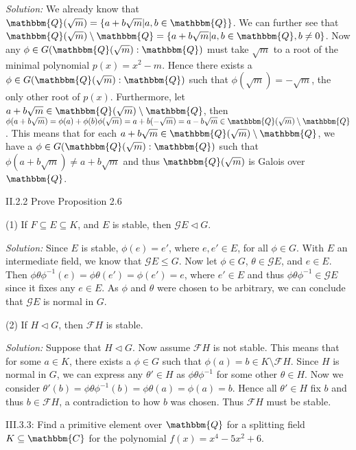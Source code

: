 \documentclass{letter}
\newcommand{\tmem}[1]{{\em #1\/}}
\begin{document}
{\tmem{Solution:}} We already know that $\mathbbm{Q}( \sqrt{m}) =\{a + b
\sqrt{m} | a, b \in \mathbbm{Q}\}$. We can further see that $\mathbbm{Q}(
\sqrt{m}) \setminus \mathbbm{Q}=\{a + b \sqrt{m} | a, b \in \mathbbm{Q}, b
\neq 0\}$. Now any $\phi \in G (\mathbbm{Q}( \sqrt{m}) : \mathbbm{Q})$ must
take $\sqrt{m}$ to a root of the minimal polynomial $p (x) = x^2 - m$. Hence
there exists a $\phi \in G (\mathbbm{Q}( \sqrt{m}) : \mathbbm{Q})$ such that
$\phi ( \sqrt{m}) = - \sqrt{m}$, the only other root of $p (x)$. Furthermore,
let $a + b \sqrt{m} \in \mathbbm{Q}( \sqrt{m}) \setminus \mathbbm{Q}$, then
$\phi (a + b \sqrt{m}) = \phi (a) + \phi (b) \phi ( \sqrt{m}) = a + b (-
\sqrt{m}) = a - b \sqrt{m} \in \mathbbm{Q}( \sqrt{m}) \setminus \mathbbm{Q}$.
This means that for each $a + b \sqrt{m} \in \mathbbm{Q}( \sqrt{m}) \setminus
\mathbbm{Q}$, we have a $\phi \in G (\mathbbm{Q}( \sqrt{m}) : \mathbbm{Q})$
such that $\phi (a + b \sqrt{m}) \neq a + b \sqrt{m}$ and thus $\mathbbm{Q}(
\sqrt{m})$ is Galois over $\mathbbm{Q}$.

II.2.2 Prove Proposition 2.6

(1) If $F \subseteq E \subseteq K$, and $E$ is stable, then $\mathcal{G} E
\vartriangleleft G$.

{\tmem{Solution:}} Since $E$ is stable, $\phi (e) = e'$, where $e, e' \in E$,
for all $\phi \in G$. With $E$ an intermediate field, we know that
$\mathcal{G} E \leq G$. Now let $\phi \in G$, $\theta \in \mathcal{G} E$, and
$e \in E$. Then $\phi \theta \phi^{- 1} (e) = \phi \theta (e') = \phi (e') =
e$, where $e' \in E$ and thus $\phi \theta \phi^{- 1} \in \mathcal{G} E$ since
it fixes any $e \in E$. As $\phi$ and $\theta$ were chosen to be arbitrary, we
can conclude that $\mathcal{G} E$ is normal in $G$.

(2) If $H \vartriangleleft G$, then $\mathcal{F} H$ is stable.

{\tmem{Solution:}} Suppose that $H \vartriangleleft G$. Now assume
$\mathcal{F} H$ is not stable. This means that for some $a \in K$, there
exists a $\phi \in G$ such that $\phi (a) = b \in K \setminus \mathcal{F} H$.
Since $H$ is normal in $G$, we can express any $\theta' \in H$ as $\phi \theta
\phi^{- 1}$ for some other $\theta \in H$. Now we consider $\theta' (b) = \phi
\theta \phi^{- 1} (b) = \phi \theta (a) = \phi (a) = b$. Hence all $\theta'
\in H$ fix $b$ and thus $b \in \mathcal{F} H$, a contradiction to how $b$ was
chosen. Thus $\mathcal{F} H$ must be stable.

III.3.3: Find a primitive element over $\mathbbm{Q}$ for a splitting field $K
\subseteq \mathbbm{C}$ for the polynomial $f (x) = x^4 - 5 x^2 + 6$.
\end{document}

